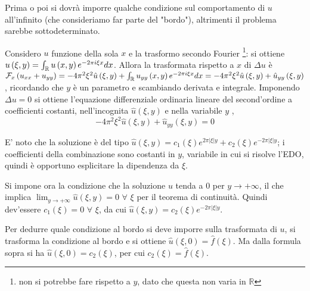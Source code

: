 \documentclass{article}
\begin{document}
Prima o poi si dovr\`{a} imporre qualche condizione sul comportamento di $u$
all'infinito (che consideriamo far parte del "bordo"), altrimenti il
problema sarebbe sottodeterminato.

Considero $u$ funzione della sola $x$ e la trasformo secondo Fourier%
\footnote{%
non si potrebbe fare rispetto a $y$, dato che questa non varia in $%
\mathbb{R}
$}: si ottiene $u\left( \xi ,y\right) =\int_{%
\mathbb{R}
}u\left( x,y\right) e^{-2\pi i\xi x}dx$. Allora la trasformata rispetto a $x$
di $\Delta u$ \`{e} $\mathcal{F}_{x}\left( u_{xx}+u_{yy}\right) =-4\pi
^{2}\xi ^{2}\hat{u}\left( \xi ,y\right) +\int_{%
\mathbb{R}
}u_{yy}\left( x,y\right) e^{-2\pi i\xi x}dx=-4\pi ^{2}\xi ^{2}\hat{u}\left(
\xi ,y\right) +\hat{u}_{yy}\left( \xi ,y\right) $, ricordando che $y$ \`{e}
un parametro e scambiando derivata e integrale. Imponendo $\Delta u=0$ si ottiene
l'equazione differenziale ordinaria lineare del second'ordine a coefficienti
costanti, nell'incognita $\hat{u}\left( \xi ,y\right) $ e nella variabile $y$%
,%
\begin{equation*}
-4\pi ^{2}\xi ^{2}\hat{u}\left( \xi ,y\right) +\hat{u}_{yy}\left( \xi
,y\right) =0
\end{equation*}

E' noto che la soluzione \`{e} del tipo $\hat{u}\left( \xi ,y\right)
=c_{1}\left( \xi \right) e^{2\pi \left\vert \xi \right\vert y}+c_{2}\left(
\xi \right) e^{-2\pi \left\vert \xi \right\vert y}$; i coefficienti della
combinazione sono costanti in $y$, variabile in cui si risolve l'EDO, quindi 
\`{e} opportuno esplicitare la dipendenza da $\xi $.

Si impone ora la condizione che la soluzione $u$ tenda a $0$ per $%
y\rightarrow +\infty $, il che implica $\lim_{y\rightarrow +\infty }\hat{u}%
\left( \xi ,y\right) =0$ $\forall $ $\xi $ per il teorema di continuit\`{a}.
Quindi dev'essere $c_{1}\left( \xi \right) =0$ $\forall $ $\xi $, da cui $%
\hat{u}\left( \xi ,y\right) =c_{2}\left( \xi \right) e^{-2\pi \left\vert \xi
\right\vert y}$.

Per dedurre quale condizione al bordo si deve imporre sulla trasformata di $%
u $, si trasforma la condizione al bordo e si ottiene $\hat{u}\left( \xi
,0\right) =\hat{f}\left( \xi \right) $. Ma dalla formula sopra si ha $\hat{u}%
\left( \xi ,0\right) =c_{2}\left( \xi \right) $, per cui $c_{2}\left( \xi
\right) =\hat{f}\left( \xi \right) $.
\end{document}
